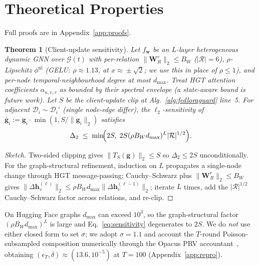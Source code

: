 \documentclass[11pt]{article}
\theoremstyle{plain}
\newtheorem{theorem}{Theorem}
\theoremstyle{definition}
\theoremstyle{remark}
\newcommand{\Dcal}{\mathcal{D}}
\newcommand{\Gcal}{\mathcal{G}}
\newcommand{\Rcal}{\mathcal{R}}
\newcommand{\norm}[1]{\|#1\|}
\begin{document}
\section{Theoretical Properties}
\label{sec:theory}

Full proofs are in Appendix~\ref{app:proofs}.

\begin{theorem}[Client-update sensitivity]
\label{thm:sensitivity}
Let $f_{\mathbf{w}}$ be an $L$-layer heterogeneous dynamic GNN
over $\Gcal(t)$ with per-relation
$\norm{\mathbf{W}_R^r}_2\!\le\!B_W$ ($|\Rcal|\!=\!6$),
$\rho$-Lipschitz $\phi^{\mathrm{nl}}$ (GELU:
$\rho\!\approx\!1.13$, at $x\!\approx\!\pm\sqrt{2}$; we use this
in place of $\rho\!\le\!1$), and per-node temporal-neighbourhood
degree at most $d_{\max}$. Treat HGT attention coefficients
$\alpha_{u,v,r}$ as bounded by their spectral envelope (a
state-aware bound is future work). Let $S$ be the client-update
clip at Alg.~\ref{alg:fedloraguard} line~5. For adjacent
$\Dcal_i\!\sim\!\Dcal_i'$ (single node-edge differ), the
$\ell_2$-sensitivity of
$\bar{\mathbf{g}}_i:=\mathbf{g}_i\!\cdot\!\min(1,S/\norm{\mathbf{g}_i}_2)$
satisfies
\begin{equation}
\Delta_2\;\le\;\min\!\Bigl(2S,\;2S(\rho B_W d_{\max})^L |\Rcal|^{1/2}\Bigr).
\label{eq:sensitivity}
\end{equation}
\end{theorem}

\begin{proof}[Sketch]
Two-sided clipping gives $\norm{T_S(\mathbf{g})}_2\!\le\!S$ so
$\Delta_2\!\le\!2S$ unconditionally. For the graph-structural
refinement, induction on $L$ propagates a single-node change
through HGT message-passing; Cauchy--Schwarz plus
$\norm{\mathbf{W}_R^r}_2\!\le\!B_W$ gives
$\norm{\Delta\mathbf{h}_v^{(\ell)}}_2\!\le\!\rho
B_W d_{\max}\norm{\Delta\mathbf{h}_v^{(\ell-1)}}_2$; iterate $L$
times, add the $|\Rcal|^{1/2}$ Cauchy--Schwarz factor across
relations, and re-clip.
\end{proof}

On Hugging Face graphs $d_{\max}$ can exceed $10^3$, so the
graph-structural factor $(\rho B_W d_{\max})^L$ is large and
Eq.~\eqref{eq:sensitivity} degenerates to $2S$. We do \emph{not}
use either closed form to set $\sigma$; we adopt $\sigma\!=\!1.1$
and account the $T$-round Poisson-subsampled composition
numerically through the Opacus PRV
accountant~\cite{gopi2021numerical}, obtaining
$(\epsilon_T,\delta)\!\approx\!(13.6,10^{-5})$ at $T\!=\!100$
(Appendix~\ref{app:repro}).
\end{document}

